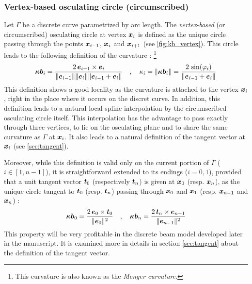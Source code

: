 \subsubsection{Vertex-based osculating circle (circumscribed)}\label{sec:circumscribed}
Let $\Gamma$ be a discrete curve parametrized by arc length. The \emph{vertex-based} (or circumscribed) osculating circle at vertex $\boldsymbol{x}_{i}$ is defined as the unique circle passing through the points $\boldsymbol{x}_{i-1}$, $\boldsymbol{x}_{i}$ and $\boldsymbol{x}_{i+1}$ (see \cref{fig:kb_vertex}). This circle leads to the following definition of the curvature : \footnote{This curvature is also known as the \emph{Menger curvature}.}
\begin{equation}
	\boldsymbol{\kappa b}_i = \frac{2 \, \boldsymbol{e}_{i-1} \times \boldsymbol{e}_{i}}{\lVert\boldsymbol{e}_{i-1}\rVert \lVert\boldsymbol{e}_{i}\rVert \lVert\boldsymbol{e}_{i-1} + \boldsymbol{e}_{i}\rVert }
	\quad , \quad
	\kappa_i = \lVert\boldsymbol{\kappa b}_i\rVert = \frac{2 \, \sin(\varphi_i)}{\lVert\boldsymbol{e}_{i-1} + \boldsymbol{e}_{i}\rVert}
\label{eq:def_kb_vertex}
\end{equation}
This definition shows a good locality as the curvature is attached to the vertex $\boldsymbol{x}_{i}$, right in the place where it occurs on the discret curve. In addition, this definition leads to a natural local spline interpolation by the circumscribed osculating circle itself. This interpolation has the advantage to pass exactly through three vertices, to lie on the osculating plane and to share the same curvature as $\Gamma$ at $\boldsymbol{x}_{i}$. It also leads to a natural definition of the tangent vector at $\boldsymbol{x}_{i}$ (see \cref{sec:tangent}).

Moreover, while this definition is valid only on the current portion of $\Gamma$ ($i \in[1, n-1]$), it is straightforward extended to its endings ($i=0,1$), provided that a unit tangent vector $\boldsymbol{t}_{0}$ (respectively $\boldsymbol{t}_{n}$) is given at $\boldsymbol{x}_{0}$ (resp. $\boldsymbol{x}_{n}$), as the unique circle tangent to $\boldsymbol{t}_{0}$ (resp. $\boldsymbol{t}_{n}$) passing through $\boldsymbol{x}_0$ and $\boldsymbol{x}_1$ (resp. $\boldsymbol{x}_{n-1}$ and $\boldsymbol{x}_n$) :
\begin{equation}
	\boldsymbol{\kappa b}_0 = \frac{2 \, \boldsymbol{e}_{0} \times \boldsymbol{t}_{0}}{\lVert\boldsymbol{e}_{0}\rVert^2} 
	\quad , \quad
	\boldsymbol{\kappa b}_n = \frac{2 \, \boldsymbol{t}_{n} \times \boldsymbol{e}_{n-1}}{\lVert\boldsymbol{e}_{n-1}\rVert^2} 
\end{equation}
This property will be very profitable in the discrete beam model developed later in the manuscript. It is examined more in details in section \cref{sec:tangent} about the definition of the tangent vector.

